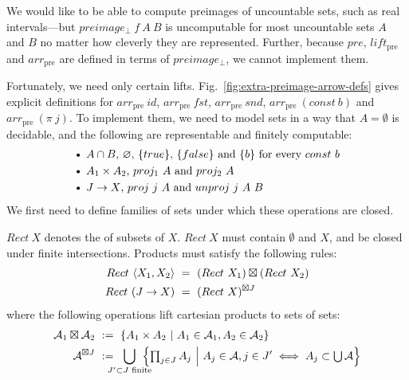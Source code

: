 \documentclass{llncs}
\newcommand{\figref}[1]{Fig.~\ref{#1}}
\newcommand{\arrowlift}{\ensuremath{lift}}
\newcommand{\arrowarr}{\ensuremath{arr}}
\newcommand{\pre}{_\mathrm{pre}}
\newcommand{\liftpre}{\arrowlift\pre}
\newcommand{\arrpre}{\arrowarr\pre}
\begin{document}
We would like to be able to compute preimages of uncountable sets, such as real intervals---but $preimage_\bot~f~A~B$ is uncomputable for most uncountable sets $A$ and $B$ no matter how cleverly they are represented.
Further, because $pre$, $\liftpre$ and $\arrpre$ are defined in terms of $preimage_\bot$, we cannot implement them.

Fortunately, we need only certain lifts.
\figref{fig:extra-preimage-arrow-defs} gives explicit definitions for $\arrpre~id$, $\arrpre~fst$, $\arrpre~snd$, $\arrpre~(const~b)$ and $\arrpre~(\pi~j)$.
To implement them, we need to model sets in a way that $A = \emptyset$ is decidable, and the following are representable and finitely computable:
\begin{equation}
\begin{aligned}
	&\text{\textbullet\ $A \i B$, $\emptyset$, $\set{true}$, $\set{false}$ and $\set{b}$ for every $const~b$} \\
	&\text{\textbullet\ $A_1 \times A_2$, $proj_1~A$ and $proj_2~A$} \\
	&\text{\textbullet\ $J \to X$, $proj~j~A$ and $unproj~j~A~B$}
\end{aligned}
\label{eqn:exact-rectangle-ops}
\end{equation}
We first need to define families of sets under which these operations are closed.

\begin{definition}
\label{def:standard-rectangle}
$Rect~X$ denotes the  of subsets of $X$.
$Rect~X$ must contain $\emptyset$ and $X$, and be closed under finite intersections.
Products must satisfy the following rules:
\begin{align}
	Rect~\langle{X_1,X_2}\rangle &\ = \ (Rect~X_1) \boxtimes (Rect~X_2)
	\label{eqn:standard-rect-finite-product-rule}
\\
	Rect~(J \to X) &\ = \ (Rect~X)^{\boxtimes J}
	\label{eqn:standard-rect-arbitrary-product-rule}
\end{align}
where the following operations lift cartesian products to sets of sets:
\begin{align}
	\A_1 \boxtimes \A_2 &\ := \ \setb{A_1 \times A_2}{A_1 \in \A_1, A_2 \in \A_2}
\\
	\A^{\boxtimes J} &\ := \ \!\!\!\!\!\!\!\displaystyle\bigcup_{J' \subset J \text{ finite}}\!\!\!\!\!\! \left\{\textstyle\prod_{j \in J} A_j\ \middle|\ A_j \in \A, j \in J' \iff A_j \subset \U\A\right\}
\label{eqn:rectangular-product}
\end{align}
\end{definition}
\end{document}
